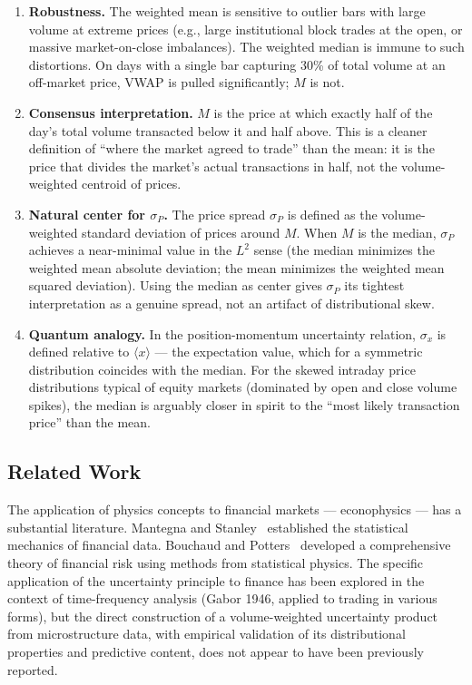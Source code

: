 \documentclass[11pt]{article}
\begin{document}
\begin{enumerate}
    \item \textbf{Robustness.} The weighted mean is sensitive to outlier bars with large volume at extreme prices (e.g., large institutional block trades at the open, or massive market-on-close imbalances). The weighted median is immune to such distortions. On days with a single bar capturing 30\% of total volume at an off-market price, VWAP is pulled significantly; $M$ is not.

    \item \textbf{Consensus interpretation.} $M$ is the price at which exactly half of the day's total volume transacted below it and half above. This is a cleaner definition of ``where the market agreed to trade'' than the mean: it is the price that divides the market's actual transactions in half, not the volume-weighted centroid of prices.

    \item \textbf{Natural center for $\sigma_P$.} The price spread $\sigma_P$ is defined as the volume-weighted standard deviation of prices around $M$. When $M$ is the median, $\sigma_P$ achieves a near-minimal value in the $L^2$ sense (the median minimizes the weighted mean absolute deviation; the mean minimizes the weighted mean squared deviation). Using the median as center gives $\sigma_P$ its tightest interpretation as a genuine spread, not an artifact of distributional skew.

    \item \textbf{Quantum analogy.} In the position-momentum uncertainty relation, $\sigma_x$ is defined relative to $\langle x \rangle$ --- the expectation value, which for a symmetric distribution coincides with the median. For the skewed intraday price distributions typical of equity markets (dominated by open and close volume spikes), the median is arguably closer in spirit to the ``most likely transaction price'' than the mean.
\end{enumerate}

\subsection{Related Work}

The application of physics concepts to financial markets --- econophysics --- has a substantial literature. Mantegna and Stanley~\cite{mantegna1999introduction} established the statistical mechanics of financial data. Bouchaud and Potters~\cite{bouchaud2003theory} developed a comprehensive theory of financial risk using methods from statistical physics. The specific application of the uncertainty principle to finance has been explored in the context of time-frequency analysis (Gabor 1946, applied to trading in various forms), but the direct construction of a volume-weighted uncertainty product from microstructure data, with empirical validation of its distributional properties and predictive content, does not appear to have been previously reported.
\end{document}
